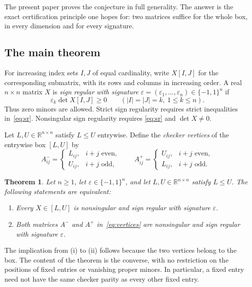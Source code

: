 \documentclass[10pt,a4paper]{article}
\newtheorem{theorem}{Theorem}[section]
\theoremstyle{definition}
\theoremstyle{remark}
\numberwithin{equation}{section}
\newcommand{\R}{\mathbb R}
\newcommand{\eps}{\varepsilon}
\begin{document}
The present paper proves the conjecture in full generality. The answer
is the exact certification principle one hopes for: two matrices suffice
for the whole box, in every dimension and for every signature.

\subsection{The main theorem}
For increasing index sets $I,J$ of equal cardinality, write $X[I,J]$
for the corresponding submatrix, with its rows and columns in increasing
order. A real $n\times n$ matrix $X$ is \emph{sign regular with
signature} $\eps=(\eps_1,\ldots,\eps_n)\in\{-1,1\}^n$ if
\begin{equation}\label{eq:sr}
  \eps_k\det X[I,J]\geq0
  \qquad (|I|=|J|=k,\ 1\leq k\leq n).
\end{equation}
Thus zero minors are allowed. Strict sign regularity requires strict
inequalities in~\eqref{eq:sr}. Nonsingular sign regularity requires
\eqref{eq:sr} and $\det X\neq0$.

Let $L,U\in\R^{n\times n}$ satisfy $L\leq U$ entrywise. Define the
\emph{checker vertices} of the entrywise box $[L,U]$ by
\begin{equation}\label{eq:vertices}
 A^-_{ij}=\begin{cases}L_{ij},&i+j\text{ even},\\U_{ij},&i+j\text{ odd},\end{cases}
 \qquad
 A^+_{ij}=\begin{cases}U_{ij},&i+j\text{ even},\\L_{ij},&i+j\text{ odd}.
 \end{cases}
\end{equation}

\begin{theorem}\label{thm:main}
Let $n\geq1$, let $\eps\in\{-1,1\}^n$, and let $L,U\in\R^{n\times n}$
satisfy $L\leq U$. The following statements are equivalent:
\begin{enumerate}
\item[(i)] Every $X\in[L,U]$ is nonsingular and sign regular with signature $\eps$.
\item[(ii)] Both matrices $A^-$ and $A^+$ in~\eqref{eq:vertices} are nonsingular
and sign regular with signature $\eps$.
\end{enumerate}
\end{theorem}

The implication from (i) to (ii) follows because the two vertices belong
to the box. The content of the theorem is the converse, with no restriction
on the positions of fixed entries or vanishing proper minors. In
particular, a fixed entry need not have the same checker parity as every
other fixed entry.
\end{document}
